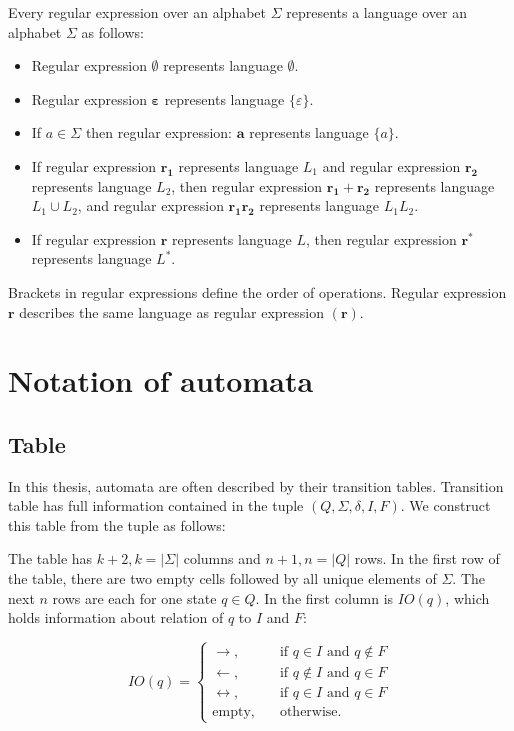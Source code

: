 \documentclass{ctuthesis}
\begin{document}
Every regular expression over an alphabet $\Sigma$ represents a language over an alphabet $\Sigma$ as follows: 
\begin{itemize}
	\item Regular expression $\boldsymbol{\emptyset}$ represents language $\emptyset$.
	\item Regular expression $\boldsymbol{\varepsilon}$ represents language $\{\varepsilon\}$.
	\item If $a \in \Sigma$ then regular expression: $\mathbf{a}$ represents language $\{a\}$.
	\item If regular expression $\mathbf{r_1}$ represents language $L_1$ and regular expression $\mathbf{r_2}$ represents language $L_2$, then regular expression $\mathbf{r_1 + r_2}$ represents language $L_1 \cup L_2$, and regular expression $\mathbf{r_1r_2}$ represents language $L_1L_2$.
	\item If regular expression $\mathbf{r}$ represents language $L$, then regular expression $\mathbf{r^*}$ represents language $L^*$.
\end{itemize}

Brackets in regular expressions define the order of operations. Regular expression $\mathbf{r}$ describes the same language as regular expression $\mathbf{(r)}$. 

\section{Notation of automata}
\subsection{Table}
\label{table}
In this thesis, automata are often described by their transition tables. Transition table has full information contained in the tuple $(Q, \Sigma, \delta, I, F)$. We construct this table from the tuple as follows:

The table has $k+2, k = |\Sigma|$ columns and $n+1, n = |Q|$ rows. In the first row of the table, there are two empty cells followed by all unique elements of $\Sigma$. The next $n$ rows are each for one state $q \in Q$. In the first column is $IO(q)$, which holds information about relation of $q$ to $I$ and $F$:

\begin{equation*}
	IO(q) = 
	\begin{cases}
		\rightarrow, & \quad \text{if } q \in I \text{ and } q \not \in F \\
		\leftarrow, & \quad \text{if } q \not \in I \text{ and } q \in F \\
		\leftrightarrow, & \quad \text{if } q \in I \text{ and } q \in F \\
		\text{empty}, & \quad \text{otherwise.}  
	\end{cases}
\end{equation*}
\end{document}
